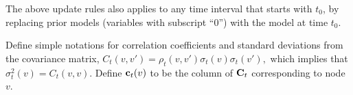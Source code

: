 The above update rules also applies to any time interval that starts with $t_0$, by replacing prior models (variables with subscript ``$0$'') with the model at time $t_0$.

Define simple notations for correlation coefficients and standard deviations from the covariance matrix, 
$
	C_t(v,v') = \rho_t(v,v')\sigma_t(v)\sigma_t(v'),
$
which implies that $\sigma_t^2(v) = C_t(v,v)$.
Define $\mathbf{c}_t(v)$ to be the column of ${\mathbf C}_t$ corresponding to node $v$.




%
%
%
%
%
%
